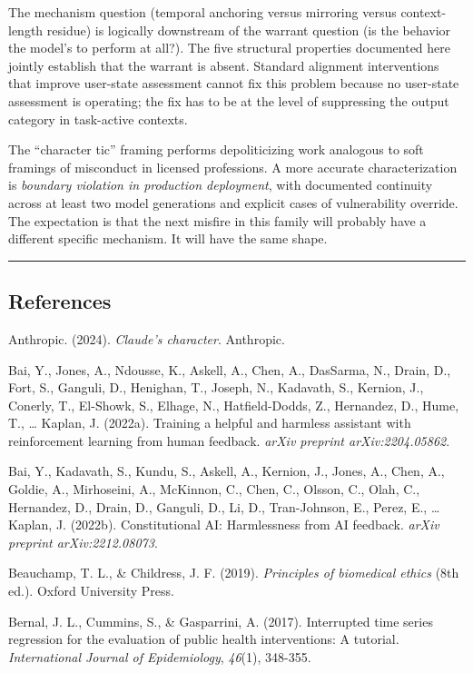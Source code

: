\documentclass[11pt]{article}
\begin{document}
The mechanism question (temporal anchoring versus mirroring versus context-length residue) is logically downstream of the warrant question (is the behavior the model's to perform at all?). The five structural properties documented here jointly establish that the warrant is absent. Standard alignment interventions that improve user-state assessment cannot fix this problem because no user-state assessment is operating; the fix has to be at the level of suppressing the output category in task-active contexts.

The ``character tic'' framing performs depoliticizing work analogous to soft framings of misconduct in licensed professions. A more accurate characterization is \emph{boundary violation in production deployment}, with documented continuity across at least two model generations and explicit cases of vulnerability override. The expectation is that the next misfire in this family will probably have a different specific mechanism. It will have the same shape.

\bigskip\hrule\bigskip

\subsection{References}

Anthropic. (2024). \emph{Claude's character}. Anthropic.

Bai, Y., Jones, A., Ndousse, K., Askell, A., Chen, A., DasSarma, N., Drain, D., Fort, S., Ganguli, D., Henighan, T., Joseph, N., Kadavath, S., Kernion, J., Conerly, T., El-Showk, S., Elhage, N., Hatfield-Dodds, Z., Hernandez, D., Hume, T., \ldots{} Kaplan, J. (2022a). Training a helpful and harmless assistant with reinforcement learning from human feedback. \emph{arXiv preprint arXiv:2204.05862}.

Bai, Y., Kadavath, S., Kundu, S., Askell, A., Kernion, J., Jones, A., Chen, A., Goldie, A., Mirhoseini, A., McKinnon, C., Chen, C., Olsson, C., Olah, C., Hernandez, D., Drain, D., Ganguli, D., Li, D., Tran-Johnson, E., Perez, E., \ldots{} Kaplan, J. (2022b). Constitutional AI: Harmlessness from AI feedback. \emph{arXiv preprint arXiv:2212.08073}.

Beauchamp, T. L., \& Childress, J. F. (2019). \emph{Principles of biomedical ethics} (8th ed.). Oxford University Press.

Bernal, J. L., Cummins, S., \& Gasparrini, A. (2017). Interrupted time series regression for the evaluation of public health interventions: A tutorial. \emph{International Journal of Epidemiology}, \emph{46}(1), 348-355.
\end{document}

